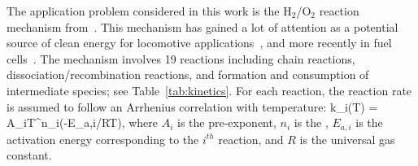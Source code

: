 The application problem considered in this work is the
H$_2$/O$_2$ reaction mechanism from~\cite{Yetter:1991}. This mechanism has gained
a lot of attention as a potential source of clean energy for
locomotive applications~\cite{Das:1996}, and more recently in fuel
 cells~\cite{Loges:2008,Cosnier:2016}. 
The mechanism involves 19
reactions including chain reactions, dissociation/recombination reactions, and
formation and consumption of intermediate species; see Table~\ref{tab:kinetics}. 
For each reaction, the reaction rate is assumed to follow an Arrhenius
correlation with temperature:
%
\be
k_i(T) = A_iT^{n_i}\exp(-E_{a,i}/RT), 
\label{eq:rate}
\ee
%
where $A_i$ is the pre-exponent, $n_i$ is the , $E_{a,i}$ is the
activation energy corresponding to the $i^{th}$ reaction, and $R$ is the
universal gas constant.  
%
%
